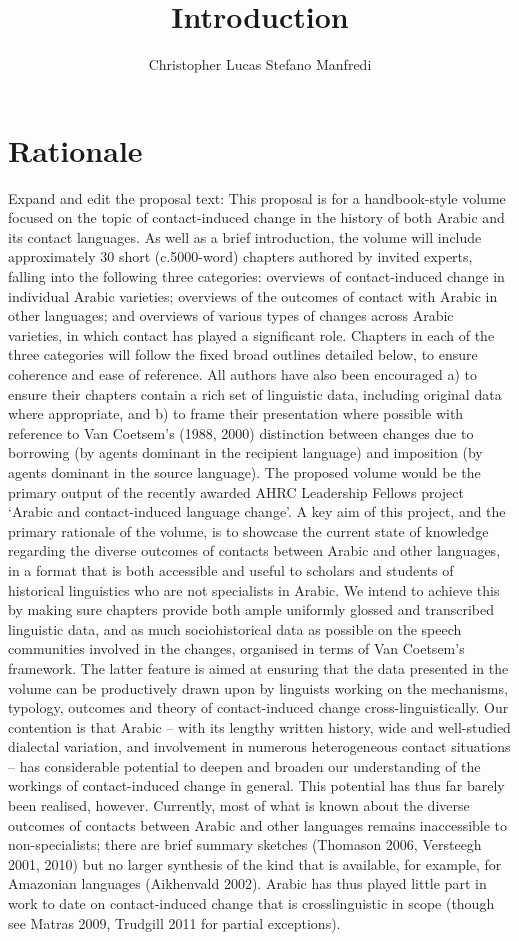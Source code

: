 \documentclass[output=paper]{langsci/langscibook}
\author{Christopher Lucas\affiliation{SOAS University of London}\lastand 
 Stefano Manfredi\affiliation{CNRS, SeDyL}
}
\title{Introduction}
\begin{document}
\section{Rationale}
Expand and edit the proposal text:
This proposal is for a handbook-style volume focused on the topic of contact-induced change in the history of both Arabic and its contact languages. As well as a brief introduction, the volume will include approximately 30 short (c.5000-word) chapters authored by invited experts, falling into the following three categories: overviews of contact-induced change in individual Arabic varieties; overviews of the outcomes of contact with Arabic in other languages; and overviews of various types of changes across Arabic varieties, in which contact has played a significant role.
Chapters in each of the three categories will follow the fixed broad outlines detailed below, to ensure coherence and ease of reference. All authors have also been encouraged a) to ensure their chapters contain a rich set of linguistic data, including original data where appropriate, and b) to frame their presentation where possible with reference to Van Coetsem’s (1988, 2000) distinction between changes due to borrowing (by agents dominant in the recipient language) and imposition (by agents dominant in the source language). 
The proposed volume would be the primary output of the recently awarded AHRC Leadership Fellows project ‘Arabic and contact-induced language change’. A key aim of this project, and the primary rationale of the volume, is to showcase the current state of knowledge regarding the diverse outcomes of contacts between Arabic and other languages, in a format that is both accessible and useful to scholars and students of historical linguistics who are not specialists in Arabic. We intend to achieve this by making sure chapters provide both ample uniformly glossed and transcribed linguistic data, and as much sociohistorical data as possible on the speech communities involved in the changes, organised in terms of Van Coetsem’s framework. The latter feature is aimed at ensuring that the data presented in the volume can be productively drawn upon by linguists working on the mechanisms, typology, outcomes and theory of contact-induced change cross-linguistically.
Our contention is that Arabic – with its lengthy written history, wide and well-studied dialectal variation, and involvement in numerous heterogeneous contact situations – has considerable potential to deepen and broaden our understanding of the workings of contact-induced change in general. This potential has thus far barely been realised, however. Currently, most of what is known about the diverse outcomes of contacts between Arabic and other languages remains inaccessible to non-specialists; there are brief summary sketches (Thomason 2006, Versteegh 2001, 2010) but no larger synthesis of the kind that is available, for example, for Amazonian languages (Aikhenvald 2002). Arabic has thus played little part in work to date on contact-induced change that is crosslinguistic in scope (though see Matras 2009, Trudgill 2011 for partial exceptions). 
\end{document}
